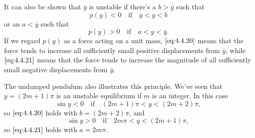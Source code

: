 \documentclass{ximera}
\begin{document}
It can also be shown %
that $\overline{y}$ is
unstable if there's a $b>\overline{y}$ such that
\begin{equation}\label{eq:4.4.20}
p(y)<0\quad\mbox{if}\quad\overline{y}<y<b
\end{equation}
or an $a<\overline{y}$ such that
\begin{equation}\label{eq:4.4.21}
p(y)>0\quad\mbox{if}\quad a<y<\overline{y}.
\end{equation}
If we regard $p(y)$ as a force acting on a unit mass,
$\eqref{eq:4.4.20}$ means that the force tends to increase all sufficiently
small positive displacements from $\overline{y}$, while $\eqref{eq:4.4.21}$
means that the force tends to increase the magnitude of all
sufficiently small negative displacements from $\overline{y}$.
 
The undamped pendulum also illustrates this principle. We've seen that
$\overline{y}=(2m+1)\pi$ is an unstable equilibrium if $m$ is an
integer. In this case
$$
\sin y<0\quad\mbox{if}\quad(2m+1)\pi<y<(2m+2)\pi,
$$
so $\eqref{eq:4.4.20}$ holds with $b=(2m+2)\pi$, and
$$
\sin y>0\quad\mbox{if}\quad 2m\pi<y<(2m+1)\pi,
$$
so $\eqref{eq:4.4.21}$ holds with $a=2m\pi$.
 
\end{document}
